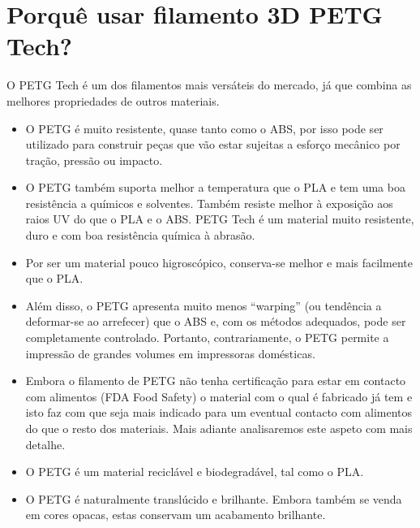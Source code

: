 \documentclass[11pt,a4paper]{article}
\begin{document}
\section{Porquê usar filamento 3D PETG Tech?}
O PETG Tech é um dos filamentos mais versáteis do mercado, já que combina as melhores propriedades de outros materiais.
\begin{itemize}
\item O PETG é muito resistente, quase tanto como o ABS, por isso pode ser utilizado para construir peças que vão estar sujeitas a esforço mecânico por tração, pressão ou impacto.
\item O PETG também suporta melhor a temperatura que o PLA e tem uma boa resistência a químicos e solventes. Também resiste melhor à exposição aos raios UV do que o PLA e o ABS. PETG Tech é um material muito resistente, duro e com boa resistência química à abrasão.
\item Por ser um material pouco higroscópico, conserva-se melhor e mais facilmente que o PLA.
\item Além disso, o PETG apresenta muito menos “warping” (ou tendência a deformar-se ao arrefecer) que o ABS e, com os métodos adequados, pode ser completamente controlado. Portanto, contrariamente, o PETG permite a impressão de grandes volumes em impressoras domésticas.
\item Embora o filamento de PETG não tenha certificação para estar em contacto com alimentos (FDA Food Safety) o material com o qual é fabricado já tem e isto faz com que seja mais indicado para um eventual contacto com alimentos do que o resto dos materiais. Mais adiante analisaremos este aspeto com mais detalhe.
\item O PETG é um material reciclável e biodegradável, tal como o PLA.
\item O PETG é naturalmente translúcido e brilhante. Embora também se venda em cores opacas, estas conservam um acabamento brilhante.
\end{itemize}
\end{document}
